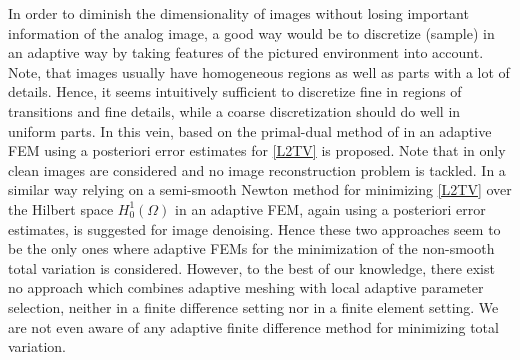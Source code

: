\documentclass[enabledeprecatedfontcommands,cleardoublepage=empty,headsepline,twoside,11pt,DIV=15,BCOR=12mm,final]{scrartcl}
\begin{document}
In order to diminish the dimensionality of images without losing important information of the analog image, a good way would be to discretize (sample) in an adaptive way by taking features of the pictured environment into account. Note, that images usually have homogeneous regions as well as parts with a lot of details. Hence, it seems intuitively sufficient to discretize fine in regions of transitions and fine details, while a coarse discretization should do well in uniform parts. In this vein, based on the primal-dual method of \cite{ChaPoc} in \cite{Bar2015} an adaptive FEM using a posteriori error estimates for \eqref{L2TV} is proposed.  %
Note that in \cite{Bar2015} only clean images are considered and no image reconstruction problem is tackled. In a similar way relying on a semi-smooth Newton method for minimizing \eqref{L2TV} over the Hilbert space $H^1_0(\Omega)$ in \cite{HinRin2014} an adaptive FEM, again using a posteriori error estimates, is suggested for image denoising. Hence these two approaches seem to be the only ones where adaptive FEMs for the minimization of the non-smooth total variation is considered. 
However, to the best of our knowledge, there exist no approach which combines adaptive meshing with local adaptive parameter selection, neither in a finite difference setting nor in a finite element setting. We are not even aware of any adaptive finite difference method for minimizing total variation.
\end{document}
